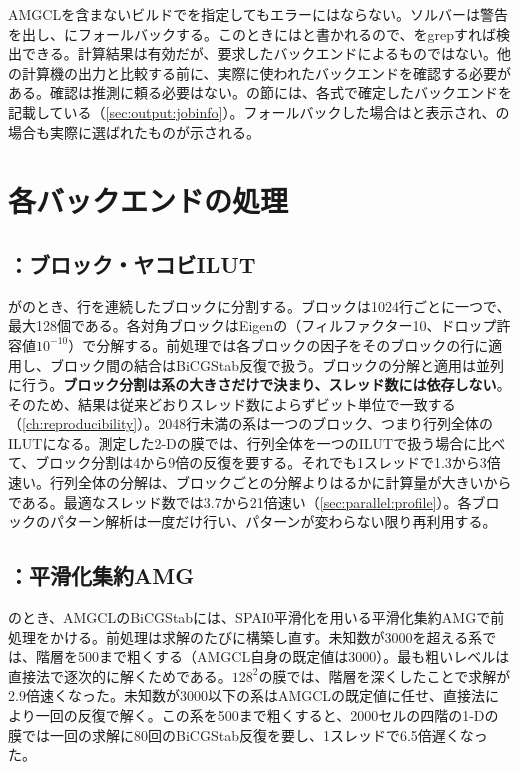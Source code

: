 AMGCLを含まないビルドでを指定してもエラーにはならない。ソルバーは警告を出し、にフォールバックする。このときにはと書かれるので、をgrepすれば検出できる。計算結果は有効だが、要求したバックエンドによるものではない。他の計算機の出力と比較する前に、実際に使われたバックエンドを確認する必要がある。確認は推測に頼る必要はない。の節には、各式で確定したバックエンドを記載している（\cref{sec:output:jobinfo}）。フォールバックした場合はと表示され、の場合も実際に選ばれたものが示される。

\section{各バックエンドの処理}
\label{sec:linsolve:what}

\subsection{：ブロック・ヤコビILUT}
\label{sec:linsolve:eigen}

がのとき、行を連続したブロックに分割する。ブロックは1024行ごとに一つで、最大128個である。各対角ブロックはEigenの（フィルファクター10、ドロップ許容値$10^{-10}$）で分解する。前処理では各ブロックの因子をそのブロックの行に適用し、ブロック間の結合はBiCGStab反復で扱う。ブロックの分解と適用は並列に行う。\textbf{ブロック分割は系の大きさだけで決まり、スレッド数には依存しない}。そのため、結果は従来どおりスレッド数によらずビット単位で一致する（\cref{ch:reproducibility}）。2048行未満の系は一つのブロック、つまり行列全体のILUTになる。測定した2-Dの膜では、行列全体を一つのILUTで扱う場合に比べて、ブロック分割は4から9倍の反復を要する。それでも1スレッドで1.3から3倍速い。行列全体の分解は、ブロックごとの分解よりはるかに計算量が大きいからである。最適なスレッド数では3.7から21倍速い（\cref{sec:parallel:profile}）。各ブロックのパターン解析は一度だけ行い、パターンが変わらない限り再利用する。

\subsection{：平滑化集約AMG}
\label{sec:linsolve:amgcl}

のとき、AMGCLのBiCGStabには、SPAI0平滑化を用いる平滑化集約AMGで前処理をかける。前処理は求解のたびに構築し直す。未知数が3000を超える系では、階層を500まで粗くする（AMGCL自身の既定値は3000）。最も粗いレベルは直接法で逐次的に解くためである。$128^2$の膜では、階層を深くしたことで求解が2.9倍速くなった。未知数が3000以下の系はAMGCLの既定値に任せ、直接法により一回の反復で解く。この系を500まで粗くすると、2000セルの四階の1-Dの膜では一回の求解に80回のBiCGStab反復を要し、1スレッドで6.5倍遅くなった。

